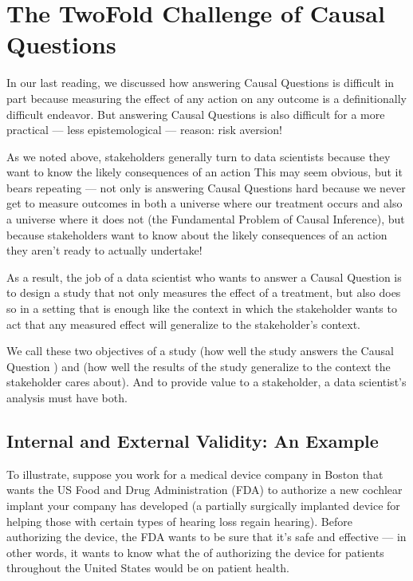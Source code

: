 \documentclass[letterpaper,10pt,english]{jupyterBook}
\begin{document}
\section{The Two\sphinxhyphen{}Fold Challenge of Causal Questions}
\label{\detokenize{30_questions/40_causal_questions_application:the-two-fold-challenge-of-causal-questions}}
\sphinxAtStartPar
In our last reading, we discussed how answering Causal Questions is difficult in part because measuring the effect of any action on any outcome is a definitionally difficult endeavor. But answering Causal Questions is also difficult for a more practical — less epistemological — reason: risk aversion!

\sphinxAtStartPar
As we noted above, stakeholders generally turn to data scientists because they want to know the likely consequences of an action  This may seem obvious, but it bears repeating — not only is answering Causal Questions hard because we never get to measure outcomes in both a universe where our treatment occurs and also a universe where it does not (the Fundamental Problem of Causal Inference), but  because stakeholders want to know about the likely consequences of an action they aren’t ready to actually undertake!

\sphinxAtStartPar
As a result, the job of a data scientist who wants to answer a Causal Question is to design a study that not only measures the effect of a treatment, but also does so in a setting that is enough like the context in which the stakeholder wants to act that any measured effect will generalize to the stakeholder’s context.

\sphinxAtStartPar
We call these two objectives of a study  (how well the study answers the Causal Question ) and  (how well the results of the study generalize to the context the stakeholder cares about). And to provide value to a stakeholder, a data scientist’s analysis must have both.


\subsection{Internal and External Validity: An Example}
\label{\detokenize{30_questions/40_causal_questions_application:internal-and-external-validity-an-example}}
\sphinxAtStartPar
To illustrate, suppose you work for a medical device company in Boston that wants the US Food and Drug Administration (FDA) to authorize a new cochlear implant your company has developed (a partially surgically implanted device for helping those with certain types of hearing loss regain hearing). Before authorizing the device, the FDA wants to be sure that it’s safe and effective — in other words, it wants to know what the  of authorizing the device for patients throughout the United States would be on patient health.
\end{document}
